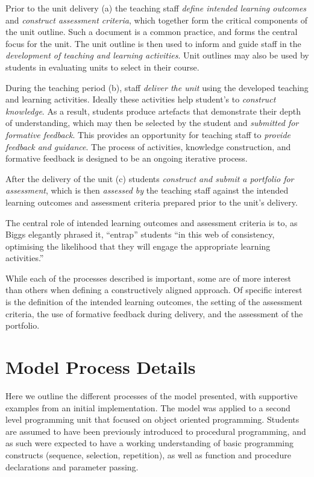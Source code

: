 Prior to the unit delivery (a) the teaching staff \emph{define intended learning outcomes} and \emph{construct assessment criteria}, which together form the critical components of the unit outline. Such a document is a common practice, and forms the central focus for the unit. The unit outline is then used to inform and guide staff in the \emph{development of teaching and learning activities}. Unit outlines may also be used by students in evaluating units to select in their course.

During the teaching period (b), staff \emph{deliver the unit} using the developed teaching and learning activities. Ideally these activities help student's to \emph{construct knowledge}. As a result, students produce artefacts that demonstrate their depth of understanding, which may then be selected by the student and \emph{submitted for formative feedback}. This provides an opportunity for teaching staff to \emph{provide feedback and guidance}. The process of activities, knowledge construction, and formative feedback is designed to be an ongoing iterative process.

After the delivery of the unit (c) students \emph{construct and submit a portfolio for assessment}, which is then \emph{assessed by} the teaching staff against the intended learning outcomes and assessment criteria prepared prior to the unit's delivery.

The central role of intended learning outcomes and assessment criteria is to, as Biggs elegantly phrased it, ``entrap'' students ``in this web of consistency, optimising the likelihood that they will engage the appropriate learning activities.''~\cite{Biggs:1999}

While each of the processes described is important, some are of more interest than others when defining a constructively aligned approach. Of specific interest is the definition of the intended learning outcomes, the setting of the assessment criteria, the use of formative feedback during delivery, and the assessment of the portfolio.

\section{Model Process Details} %
\label{sec:process_details}

Here we outline the different processes of the model presented, with supportive examples from an initial implementation. The model was applied to a second level programming unit that focused on object oriented programming. Students are assumed to have been previously introduced to procedural programming, and as such were expected to have a working understanding of basic programming constructs (sequence, selection, repetition), as well as function and procedure declarations and parameter passing. 

